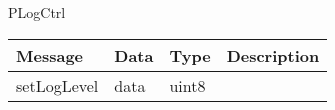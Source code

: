  {PLogCtrl}

\begin{tabular}[ht]{|l|l|l|p{8cm}|}
\hline
Message & Data & Type & Description\\
\hline
setLogLevel &  data  &  uint8  & \\
\hline
\end{tabular}
